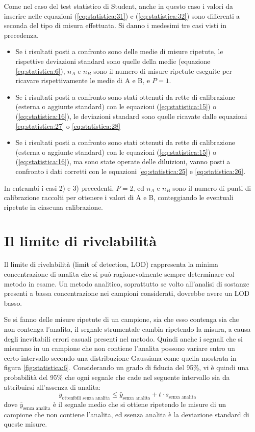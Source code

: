 Come nel caso del test statistico di Student, anche in questo caso i valori da inserire nelle equazioni (\ref{eq:statistica:31}) e (\ref{eq:statistica:32}) sono differenti a seconda del tipo di misura effettuata. Si danno i medesimi tre casi visti in precedenza.
\begin{itemize}
\item Se i risultati posti a confronto sono delle medie di misure ripetute, le rispettive deviazioni standard sono quelle della medie (equazione \ref{eq:statistica:6}), $n_A$ e $n_B$ sono il numero di misure ripetute eseguite per ricavare rispettivamente le medie di A e B, e $P = 1$.
\item Se i risultati posti a confronto sono stati ottenuti da rette di calibrazione (esterna o aggiunte standard) con le equazioni (\ref{eq:statistica:15}) o (\ref{eq:statistica:16}), le deviazioni standard sono quelle ricavate dalle equazioni \ref{eq:statistica:27} o \ref{eq:statistica:28}
\item Se i risultati posti a confronto sono stati ottenuti da rette di calibrazione (esterna o aggiunte standard) con le equazioni (\ref{eq:statistica:15}) o (\ref{eq:statistica:16}), ma sono state operate delle diluizioni, vanno posti a confronto i dati corretti con le equazioni \ref{eq:statistica:25} e \ref{eq:statistica:26}.
\end{itemize}

In entrambi i casi 2) e 3) precedenti, $P = 2$, ed $n_A$ e $n_B$ sono il numero di punti di calibrazione raccolti per ottenere i valori di A e B, conteggiando le eventuali ripetute in ciascuna calibrazione.

\section{Il limite di rivelabilità}

Il limite di rivelabilità (limit of detection, LOD) rappresenta la minima concentrazione di analita che si può ragionevolmente sempre determinare col metodo in esame. Un metodo analitico, soprattutto se volto all'analisi di sostanze presenti a bassa concentrazione nei campioni considerati, dovrebbe avere un LOD basso.

Se si fanno delle misure ripetute di un campione, sia che esso contenga sia che non contenga l'analita, il segnale strumentale cambia ripetendo la misura, a causa degli inevitabili errori casuali presenti nel metodo. Quindi anche i segnali che si misurano in un campione che non contiene l'analita possono variare entro un certo intervallo secondo una distribuzione Gaussiana come quella mostrata in figura \ref{fig:statistica:6}. Considerando un grado di fiducia del 95\%, vi è quindi una probabilità del 95\% che ogni segnale che cade nel seguente intervallo sia da attribuirsi all'assenza di analita:
\[
y_{\text{ottenibili senza analita}} \leq \bar{y}_{\text{senza analita}} + t \cdot s_{\text{senza analita}}
\]
dove $\bar{y}_{\text{senza analita}}$ è il segnale medio che si ottiene ripetendo le misure di un campione che non contiene l'analita, ed ssenza analita è la deviazione standard di queste misure.

